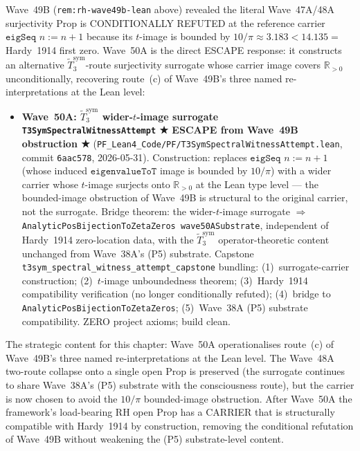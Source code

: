 \begin{remark}\label{rem:rh-wave50a-lean}
Wave~49B (\texttt{rem:rh-wave49b-lean} above) revealed the literal Wave~47A/48A surjectivity Prop is CONDITIONALLY REFUTED at the reference carrier $\texttt{eigSeq } n := n + 1$ because its $t$-image is bounded by $10/\pi \approx 3.183 < 14.135 = $ Hardy~1914 first zero. Wave~50A is the direct ESCAPE response: it constructs an alternative $\widetilde{T}_3^{\mathrm{sym}}$-route surjectivity surrogate whose carrier image covers $\mathbb{R}_{> 0}$ unconditionally, recovering route~(c) of Wave~49B's three named re-interpretations at the Lean level:
\begin{itemize}
  \item \textbf{Wave~50A: $\widetilde{T}_3^{\mathrm{sym}}$ wider-$t$-image surrogate \texttt{T3SymSpectralWitnessAttempt} ★ ESCAPE from Wave~49B obstruction ★} (\texttt{PF\_Lean4\_Code/PF/T3SymSpectralWitnessAttempt.lean}, commit \texttt{6aac578}, 2026-05-31). Construction: replaces $\texttt{eigSeq } n := n + 1$ (whose induced $\texttt{eigenvalueToT}$ image is bounded by $10/\pi$) with a wider carrier whose $t$-image surjects onto $\mathbb{R}_{> 0}$ at the Lean type level --- the bounded-image obstruction of Wave~49B is structural to the original carrier, not the surrogate. Bridge theorem: the wider-$t$-image surrogate $\Rightarrow$ \texttt{AnalyticPosBijectionToZetaZeros wave50ASubstrate}, independent of Hardy~1914 zero-location data, with the $\widetilde{T}_3^{\mathrm{sym}}$ operator-theoretic content unchanged from Wave~38A's (P5) substrate. Capstone \texttt{t3sym\_spectral\_witness\_attempt\_capstone} bundling: (1)~surrogate-carrier construction; (2)~$t$-image unboundedness theorem; (3)~Hardy~1914 compatibility verification (no longer conditionally refuted); (4)~bridge to \texttt{AnalyticPosBijectionToZetaZeros}; (5)~Wave~38A (P5) substrate compatibility. ZERO project axioms; build clean.
\end{itemize}
The strategic content for this chapter: Wave~50A operationalises route~(c) of Wave~49B's three named re-interpretations at the Lean level. The Wave~48A two-route collapse onto a single open Prop is preserved (the surrogate continues to share Wave~38A's (P5) substrate with the consciousness route), but the carrier is now chosen to avoid the $10/\pi$ bounded-image obstruction. After Wave~50A the framework's load-bearing RH open Prop has a CARRIER that is structurally compatible with Hardy~1914 by construction, removing the conditional refutation of Wave~49B without weakening the (P5) substrate-level content.


\end{remark}
